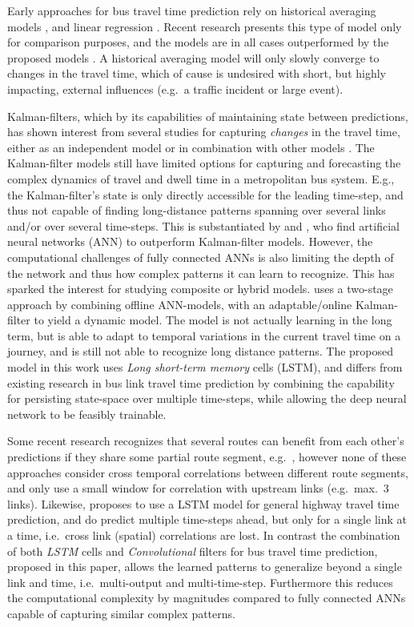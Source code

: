 \documentclass[preprint,11pt,5p,twocolumn]{elsarticle}
\begin{document}
Early approaches for bus travel time prediction rely on historical averaging models \cite{Dailey1999,Sun2007}, and linear regression \cite{Patnaik2004}. Recent research presents this type of model only for comparison purposes, and the models are in all cases outperformed by the proposed models \cite{Shalaby2004,Jeong2005}. A historical averaging model will only slowly converge to changes in the travel time, which of cause is undesired with short, but highly impacting, external influences (e.g.\ a traffic incident or large event). 

Kalman-filters, which by its capabilities of maintaining state between predictions, has shown interest from several studies for capturing \emph{changes} in the travel time, either as an independent model \cite{Chen2001,Shalaby2004} or in combination with other models \cite{Yo2010,Bai2015}. The Kalman-filter models still have limited options for capturing and forecasting the complex dynamics of travel and dwell time in a metropolitan bus system. E.g., the Kalman-filter's state is only directly accessible for the leading time-step, and thus not capable of finding long-distance patterns spanning over several links and/or over several time-steps. This is substantiated by \cite{Lin2013} and \cite{Kumar2014}, who find artificial neural networks (ANN) to outperform Kalman-filter models. However, the computational challenges of fully connected ANNs is also limiting the depth of the network and thus how complex patterns it can learn to recognize. This has sparked the interest for studying composite or hybrid models. \citet{Bai2015} uses a two-stage approach by combining offline ANN-models, with an adaptable/online Kalman-filter to yield a dynamic model. The model is not actually learning in the long term, but is able to adapt to temporal variations in the current travel time on a journey, and is still not able to recognize long distance patterns. The proposed model in this work uses \emph{Long short-term memory} cells (LSTM), and differs from existing research in bus link travel time prediction by combining the capability for persisting state-space over multiple time-steps, while allowing the deep neural network to be feasibly trainable.

Some recent research recognizes that several routes can benefit from each other's predictions if they share some partial route segment, e.g.\ \cite{Yu2011,Gal2014,Bai2015}, however none of these approaches consider cross temporal correlations between different route segments, and only use a small window for correlation with upstream links (e.g.\ max.\ 3 links). Likewise, \citet{YanjieDuan2016} proposes to use a LSTM model for general highway travel time prediction, and do predict multiple time-steps ahead, but only for a single link at a time, i.e.\ cross link (spatial) correlations are lost. In contrast the combination of both \emph{LSTM} cells and \emph{Convolutional} filters for bus travel time prediction, proposed in this paper, allows the learned patterns to generalize beyond a single link and time, i.e.\ multi-output and multi-time-step. Furthermore this reduces the computational complexity by magnitudes compared to fully connected ANNs capable of capturing similar complex patterns.
\end{document}
